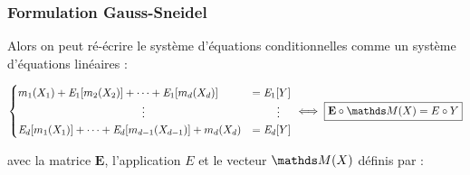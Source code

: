 {


\subsubsection{Formulation Gauss-Sneidel}
    
    Alors on peut ré-écrire le système d'équations conditionnelles comme un système d'équations linéaires :

    \begin{equation}
        \begin{cases}
            m_1(X_1) + \mathit E_1 [m_2(X_2)] + \dots + \mathit E_1[m_d(X_d)]  &= \mathit E_1[Y] \\ 
            \hspace{4cm} \vdots &  \hspace{0.8cm} \vdots \\
            \mathit E_d [m_1(X_1)]  + \dots + \mathit E_d [m_{d-1}(X_{d-1})]  + m_d(X_d) &= \mathit E_d[Y]
        \end{cases}\iff \boxed{\mathbf E \circ \grandM(X) = E \circ Y}
    \end{equation}

    avec la matrice $\mathbf E$, l'application $E$ et le vecteur $\grandM(X)$ définis par :

}
